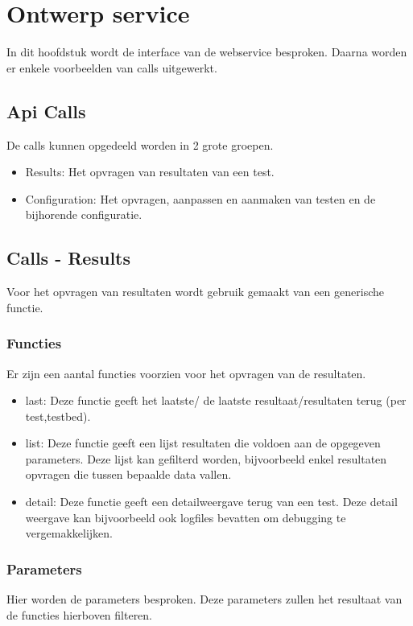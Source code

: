 \newpage
\chapter{Ontwerp service}

In dit hoofdstuk wordt de interface van de webservice besproken. Daarna worden er enkele voorbeelden van calls uitgewerkt.

\section{Api Calls}
De calls kunnen opgedeeld worden in 2 grote groepen.
\begin{itemize}
\item Results: Het opvragen van resultaten van een test.
\item Configuration: Het opvragen, aanpassen en aanmaken van testen en de bijhorende configuratie.
\end{itemize}

\section{Calls - Results}
Voor het opvragen van resultaten wordt gebruik gemaakt van een generische functie.

\subsection{Functies}
Er zijn een aantal functies voorzien voor het opvragen van de resultaten.
\begin{itemize}
\item last: Deze functie geeft het laatste/ de laatste resultaat/resultaten terug (per test,testbed).
\item list: Deze functie geeft een lijst resultaten die voldoen aan de opgegeven parameters. Deze lijst kan gefilterd worden, bijvoorbeeld enkel resultaten opvragen die tussen bepaalde data vallen.
\item detail: Deze functie geeft een detailweergave terug van een test. Deze detail weergave kan bijvoorbeeld ook logfiles bevatten om debugging te vergemakkelijken.
\end{itemize}

\subsection{Parameters}
Hier worden de parameters besproken. Deze parameters zullen het resultaat van de functies hierboven filteren.


